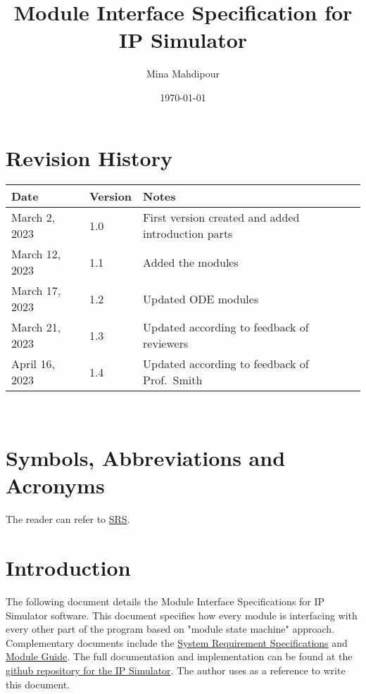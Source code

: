 \documentclass[12pt, titlepage]{article}
\begin{document}
\title{Module Interface Specification for IP Simulator}

\author{Mina Mahdipour}

\date{\today}

\maketitle


\section{Revision History}

\begin{tabularx}{\textwidth}{p{3cm}p{2cm}X}
\toprule {\bf Date} & {\bf Version} & {\bf Notes}\\
\midrule
March 2, 2023 & 1.0 & First version created and added introduction parts\\
March 12, 2023 & 1.1 &  Added the modules\\
March 17, 2023 & 1.2 &  Updated ODE modules\\
March 21, 2023 & 1.3 &  Updated according to feedback of reviewers\\
April 16, 2023 & 1.4 &  Updated according to feedback of Prof.\ Smith\\
\bottomrule
\end{tabularx}

~\newpage

\section{Symbols, Abbreviations and Acronyms}

The reader can refer to \href{https://github.com/MinMah23/CAS741-Project/tree/main/docs/SRS}{SRS}. 

\newpage

\tableofcontents
\listoftables


\newpage


\section{Introduction}

The following document details the Module Interface Specifications for IP Simulator software. This document specifies how every module is interfacing with every other part of the program based on "module state machine" approach.
\\Complementary documents include the \href{https://github.com/MinMah23/CAS741-Project/tree/main/docs/SRS}{System Requirement Specifications}
and \href{https://github.com/MinMah23/CAS741-Project/tree/main/docs/Design/SoftArchitecture}{Module Guide}.  The full documentation and implementation can be
found at the \href{https://github.com/MinMah23/CAS741-Project}{github repository for the IP Simulator}. The author uses \cite{Smith2016} as a reference to write this document.
\end{document}
